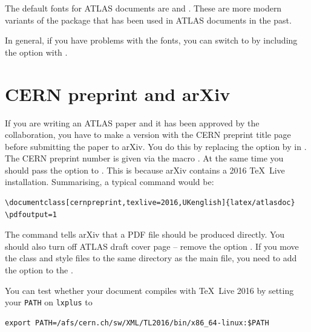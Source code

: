The default fonts for ATLAS documents are  and .
These are more modern variants of the package  that has been used in
ATLAS documents in the past.

In general, if you have problems with the  fonts,
you can switch to  by including the option  with .


\section{CERN preprint and arXiv}
\label{sec:preprint}

If you are writing an ATLAS paper and it has been approved by the collaboration,
you have to make a version with the CERN preprint title page before submitting the paper to arXiv.
You do this by replacing the option  by  in .
The CERN preprint number is given via the macro .
At the same time you should pass the option  to
.
This is because arXiv contains a 2016 \TeX\ Live installation.
Summarising, a typical  command would be:
\begin{verbatim}
\documentclass[cernpreprint,texlive=2016,UKenglish]{latex/atlasdoc}
\pdfoutput=1
\end{verbatim}
The  command tells arXiv that a PDF file should be produced directly.
You should also turn off ATLAS draft cover page -- remove the option .
If you move the class and style files to the same directory as the main file,
you need to add the option  to the .

You can test whether your document compiles with \TeX\ Live 2016 by setting your \texttt{PATH} on \texttt{lxplus} to
\begin{verbatim}
export PATH=/afs/cern.ch/sw/XML/TL2016/bin/x86_64-linux:$PATH
\end{verbatim}

